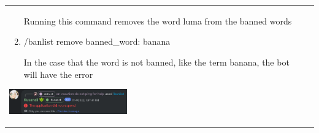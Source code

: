 \documentclass{scrartcl}
\begin{document}
\begin{tabularx}{\textwidth}{|>{\raggedright\arraybackslash}X|>{\raggedright\arraybackslash}X|}
\begin{enumerate}
    Running this command removes the word luma from the banned words
    
    \item /banlist remove banned\_word: \color{gray} banana \color{black}
    
    In the case that the word is not banned, like the term banana, the bot will have the error 
\end{enumerate}
\begin{center}
    \includegraphics[width=2in]{images/banlist/no respond.png}
\end{center}
\hline
\end{tabularx}

\newpage
\end{document}
